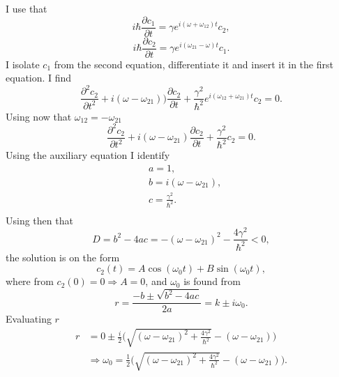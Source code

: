 \begin{example}
\begin{enumerate}
		I use that
		\begin{equation}
			i\hbar\frac{\partial c_1}{\partial t}=\gamma e^{i(\omega+\omega_{12}) t}c_2,
		\end{equation} 
		\begin{equation}
			i\hbar\frac{\partial c_2}{\partial t}=\gamma e^{i(\omega_{21}-\omega) t}c_1.
			\label{eq28}
		\end{equation} 
		I isolate $c_1$ from the second equation, differentiate it and insert it in the first equation. I find
		\begin{equation}
			\frac{\partial^2 c_2}{\partial t^2}+i(\omega-\omega_{21}))\frac{\partial c_2}{\partial t}+\frac{\gamma^2}{\hbar^2} e^{i(\omega_{12}+\omega_{21})t}c_2=0.
		\end{equation} 
		Using now that $\omega_{12}=-\omega_{21}$
		\begin{equation}
			\frac{\partial^2 c_2}{\partial t^2}+i(\omega-\omega_{21})\frac{\partial c_2}{\partial t}+\frac{\gamma^2}{\hbar^2}c_2=0.
		\end{equation} 
		Using the auxiliary equation I identify
		\begin{equation}
			\begin{split}
				&a=1,\\
				&b=i(\omega-\omega_{21}),\\
				&c=\frac{\gamma^2}{\hbar^2}.\\
			\end{split}
		\end{equation} 
		Using then that
		\begin{equation}
			D=b^2-4ac=-(\omega-\omega_{21})^2-\frac{4\gamma^2}{\hbar^2}<0,
		\end{equation} 
		the solution is on the form
		\begin{equation}
			c_2(t)=A\cos(\omega_0t)+B\sin(\omega_0t),
		\end{equation} 
		where from $c_2(0)=0\Rightarrow A=0$, and $\omega_0$ is found from
		\begin{equation}
			r=\frac{-b\pm\sqrt{b^2-4ac}}{2a}=k\pm i\omega_0.
		\end{equation} 
		Evaluating $r$
		\begin{equation}
			\begin{split}
				r&=0\pm\frac{i}{2}\bigg(\sqrt{(\omega-\omega_{21})^2+\frac{4\gamma^2}{\hbar^2}}-(\omega-\omega_{21})\bigg)\\
				&\Rightarrow \omega_0=\frac{1}{2}\bigg(\sqrt{(\omega-\omega_{21})^2+\frac{4\gamma^2}{\hbar^2}}-(\omega-\omega_{21})\bigg).
			\end{split}

\end{equation}
\end{enumerate}
\end{example}
